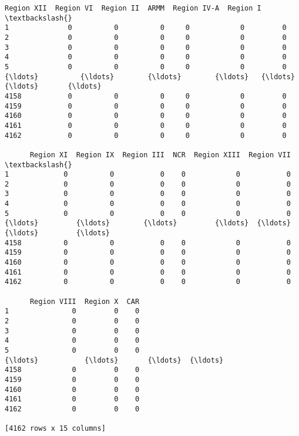 \documentclass[11pt]{article}
\makeatletter
\newcommand{\boxspacing}{\kern\kvtcb@left@rule\kern\kvtcb@boxsep}
\newcommand{\prompt}[4]{
        {\ttfamily\llap{{\color{#2}[#3]:\hspace{3pt}#4}}\vspace{-\baselineskip}}
    }
\makeatother
\begin{document}
            \begin{tcolorbox}[breakable, size=fbox, boxrule=.5pt, pad at break*=1mm, opacityfill=0]
\prompt{Out}{outcolor}{56}{\boxspacing}
\begin{Verbatim}[commandchars=\\\{\}]
      Region XII  Region VI  Region II  ARMM  Region IV-A  Region I  \textbackslash{}
1              0          0          0     0            0         0
2              0          0          0     0            0         0
3              0          0          0     0            0         0
4              0          0          0     0            0         0
5              0          0          0     0            0         0
{\ldots}          {\ldots}        {\ldots}        {\ldots}   {\ldots}          {\ldots}       {\ldots}
4158           0          0          0     0            0         0
4159           0          0          0     0            0         0
4160           0          0          0     0            0         0
4161           0          0          0     0            0         0
4162           0          0          0     0            0         0

      Region XI  Region IX  Region III  NCR  Region XIII  Region VII  \textbackslash{}
1             0          0           0    0            0           0
2             0          0           0    0            0           0
3             0          0           0    0            0           0
4             0          0           0    0            0           0
5             0          0           0    0            0           0
{\ldots}         {\ldots}        {\ldots}         {\ldots}  {\ldots}          {\ldots}         {\ldots}
4158          0          0           0    0            0           0
4159          0          0           0    0            0           0
4160          0          0           0    0            0           0
4161          0          0           0    0            0           0
4162          0          0           0    0            0           0

      Region VIII  Region X  CAR
1               0         0    0
2               0         0    0
3               0         0    0
4               0         0    0
5               0         0    0
{\ldots}           {\ldots}       {\ldots}  {\ldots}
4158            0         0    0
4159            0         0    0
4160            0         0    0
4161            0         0    0
4162            0         0    0

[4162 rows x 15 columns]
\end{Verbatim}
\end{tcolorbox}
        
\end{document}
